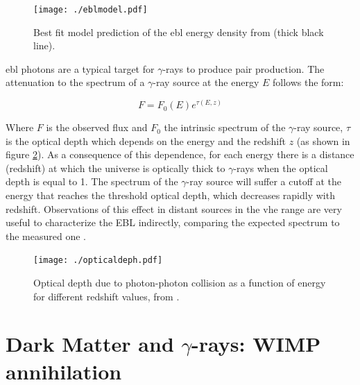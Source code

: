 \documentclass[main.tex]{subfiles}
\begin{document}
\begin{figure}[h]
\centering
 \texttt{[image: ./eblmodel.pdf]}
  \caption{Best fit model prediction of the \gls{ebl} energy density from \cite{FranceschiniEBL} (thick black line).}
    \label{fig:eblmodel}
\end{figure}

\gls{ebl} photons are a typical target for $\gamma$-rays to produce pair production. The attenuation to the spectrum of a $\gamma$-ray source at the energy $E$ follows the form:

\begin{equation}
    F = F_{0}(E) e^{\tau(E,z)} 
\end{equation}

Where $F$ is the observed flux and $F_{0}$ the intrinsic spectrum of the $\gamma$-ray source, $\tau$ is the optical depth which depends on the energy and the redshift $z$ (as shown in figure \ref{fig:depth}). As a consequence of this dependence, for each energy there is a distance (redshift) at which the universe is optically thick to $\gamma$-rays when the optical depth is equal to 1. The spectrum of the $\gamma$-ray source will suffer a cutoff at the energy that reaches the threshold optical depth, which decreases rapidly with redshift. Observations of this effect in distant sources in the \gls{vhe} range are very useful to characterize the EBL indirectly, comparing the expected spectrum to the measured one \cite{2017ICRCEBL}.

\begin{figure}[h]
\centering
 \texttt{[image: ./opticaldeph.pdf]}
  \caption{Optical depth due to photon-photon collision as a function of energy for different redshift values, from \cite{FranceschiniEBL}.}
    \label{fig:depth}
\end{figure}


\section{Dark Matter and $\gamma$-rays: WIMP annihilation} \label{sec:DM}
\end{document}
